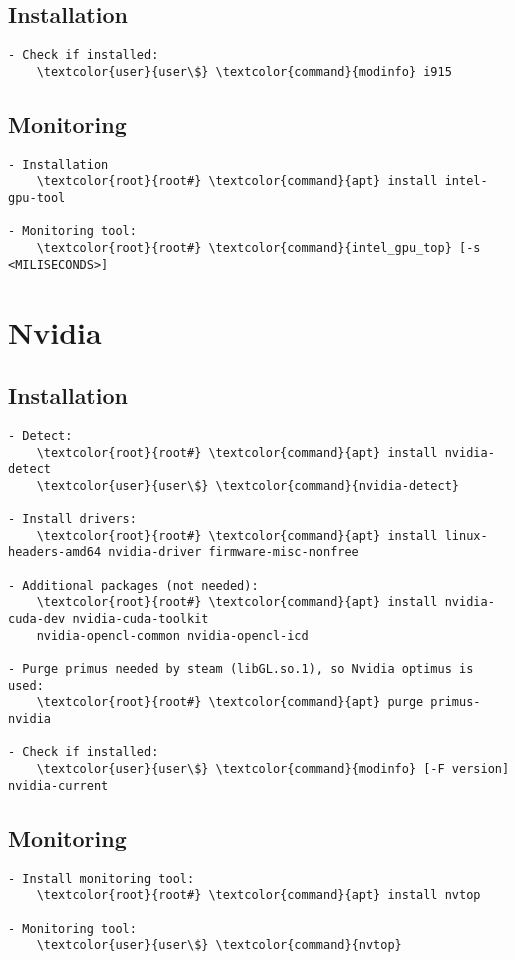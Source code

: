 \documentclass[10pt, a4paper, onecolumn, openany]{book} %
\begin{document}
\subsection{Installation}
\begin{Verbatim}[commandchars=\\\{\}]
- Check if installed:
    \textcolor{user}{user\$} \textcolor{command}{modinfo} i915
\end{Verbatim}

\subsection{Monitoring}
\begin{Verbatim}[commandchars=\\\{\}]
- Installation
    \textcolor{root}{root#} \textcolor{command}{apt} install intel-gpu-tool
    
- Monitoring tool:
    \textcolor{root}{root#} \textcolor{command}{intel_gpu_top} [-s <MILISECONDS>]
\end{Verbatim}

\section{Nvidia}
\subsection{Installation}
\begin{Verbatim}[commandchars=\\\{\}]
- Detect:
    \textcolor{root}{root#} \textcolor{command}{apt} install nvidia-detect
    \textcolor{user}{user\$} \textcolor{command}{nvidia-detect}

- Install drivers:
    \textcolor{root}{root#} \textcolor{command}{apt} install linux-headers-amd64 nvidia-driver firmware-misc-nonfree

- Additional packages (not needed):
    \textcolor{root}{root#} \textcolor{command}{apt} install nvidia-cuda-dev nvidia-cuda-toolkit    
    nvidia-opencl-common nvidia-opencl-icd
    
- Purge primus needed by steam (libGL.so.1), so Nvidia optimus is used:
    \textcolor{root}{root#} \textcolor{command}{apt} purge primus-nvidia
    
- Check if installed:
    \textcolor{user}{user\$} \textcolor{command}{modinfo} [-F version] nvidia-current
\end{Verbatim}
\subsection{Monitoring}
\begin{Verbatim}[commandchars=\\\{\}]
- Install monitoring tool:
    \textcolor{root}{root#} \textcolor{command}{apt} install nvtop
    
- Monitoring tool:
    \textcolor{user}{user\$} \textcolor{command}{nvtop}
\end{Verbatim}
\end{document}
